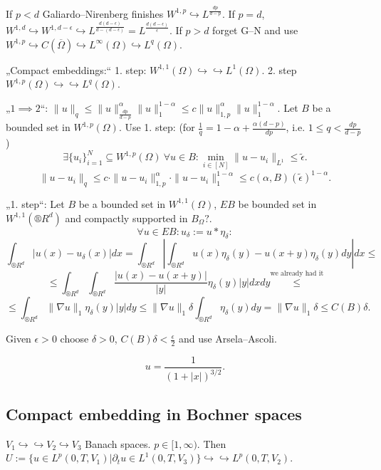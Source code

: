 \documentclass[12pt]{article}					%
\begin{document}
\begin{veta}
	\begin{dukazin}
		If $p < d$ Galiardo–Nirenberg finishes $W^{1, p} \hookrightarrow L^{\frac{dp}{d - p}}$. If $p = d$, $W^{1, d} \hookrightarrow W^{1, d - \epsilon} \hookrightarrow L^{\frac{d(d - \epsilon)}{d - (d - \epsilon)}} = L^{\frac{d(d - \epsilon)}{\epsilon}}$. If $p > d$ forget G–N and use $W^{1, p} \hookrightarrow C(\overline{\Omega}) \hookrightarrow L^∞(\Omega) \hookrightarrow L^q(\Omega)$.

		„Compact embeddings:“ 1. step: $W^{1, 1}(\Omega) \hookrightarrow \hookrightarrow L^1(\Omega)$. 2. step $W^{1, p}(\Omega) \hookrightarrow \hookrightarrow L^q(\Omega)$.

		„$1 \implies 2$“: $\|u\|_q ≤ \|u\|_{\frac{dp}{d - p}}^\alpha \|u\|_1^{1 - \alpha} ≤ c \|u\|_{1, p}^\alpha \|u\|_1^{1 - \alpha}$. Let $B$ be a bounded set in $W^{1, p}(\Omega)$. Use 1. step: (for $\frac{1}{q} = 1 - \alpha + \frac{\alpha(d - p)}{dp}$, i.e. $1 ≤ q < \frac{dp}{d - p}$)
		$$ \exists \{u_i\}_{i=1}^N \subseteq W^{1, p}(\Omega)\ \forall u \in B: \min_{i\in [N]} \|u - u_i\|_{L^1} ≤ \tilde\epsilon. $$
		$$ \|u - u_i\|_q ≤ c·\|u - u_i\|_{1,p}^\alpha·\|u - u_i\|_1^{1 - \alpha} ≤ c(\alpha, B)(\tilde \epsilon)^{1 - \alpha}. $$

		„1. step“: Let $B$ be a bounded set in $W^{1, 1}(\Omega)$, $EB$ be bounded set in $W^{1, 1}(®R^d)$ and compactly supported in $B_\Omega?$.
		$$ \forall u \in EB: u_\delta := u * \eta_\delta: $$
		$$ \int_{®R^d} |u(x) - u_\delta(x)| dx = \int_{®R^d} \left| \int_{®R^d} u(x) \eta_\delta(y) - u(x + y) \eta_\delta(y) dy\right| dx ≤ $$
		$$ ≤ \int_{®R^d} \int_{®R^d} \frac{|u(x) - u(x + y)|}{|y|} \eta_\delta(y) |y| dx dy \overset{\text{we already had it}}≤ $$
		$$ ≤ \int_{®R^d} \|\nabla u\|_1 \eta_\delta(y) |y| dy ≤ \|\nabla u\|_1 \delta \int_{®R^d} \eta_\delta(y) dy  = \|\nabla u\|_1 \delta ≤ C(B) \delta. $$

		Given $\epsilon > 0$ choose $\delta > 0$, $C(B) \delta < \frac{\epsilon}{2}$ and use Arsela–Ascoli.
	\end{dukazin}

	\begin{poznamkain}
		$$ u = \frac{1}{(1 + |x|)^{3 / 2}}. $$
	\end{poznamkain}
\end{veta}

\subsection{Compact embedding in Bochner spaces}
\begin{lemma}
	$V_1 \hookrightarrow \hookrightarrow V_2 \hookrightarrow V_3$ Banach spaces. $p \in [1, ∞)$. Then $U:=\{u \in L^p(0, T, V_1) | \partial_t u \in L^1(0, T, V_3)\} \hookrightarrow \hookrightarrow L^p(0, T, V_2)$.
\end{lemma}
\end{document}
